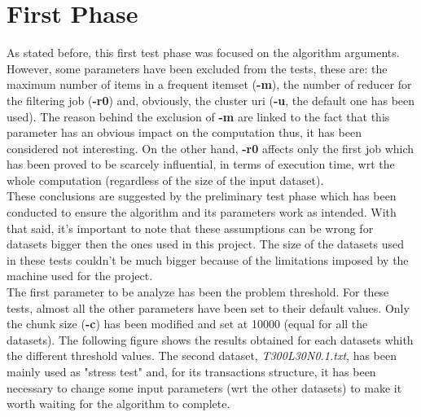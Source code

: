 \documentclass[]{report}
\begin{document}
   	\section*{First Phase}
   	
   	As stated before, this first test phase was focused on the algorithm arguments. However, some parameters have been excluded from the tests, these are: the maximum number of items in a frequent itemset (\textbf{-m}), the number of reducer for the filtering job (\textbf{-r0}) and, obviously, the cluster uri (\textbf{-u}, the default one has been used). The reason behind the exclusion of \textbf{-m} are linked to the fact that this parameter has an obvious impact on the computation thus, it has been considered not interesting. On the other hand, \textbf{-r0} affects only the first job which has been proved to be scarcely influential, in terms of execution time, wrt the whole computation (regardless of the size of the input dataset). \\
   	These conclusions are suggested by the preliminary test phase which has been conducted to ensure the algorithm and its parameters work as intended. With that said, it's important to note that these assumptions can be wrong for datasets bigger then the ones used in this project. The size of the datasets used in these tests couldn't be much bigger because of the limitations imposed by the machine used for the project.\\
   	The first parameter to be analyze has been the problem threshold. For these tests, almost all the other parameters have been set to their default values. Only the chunk size (\textbf{-c}) has been modified and set at 10000 (equal for all the datasets).      
   	The following figure shows the results obtained for each datasets whith the different threshold values. The second dataset, \textit{T300L30N0.1.txt}, has been mainly used as "stress test" and, for its transactions structure, it has been necessary to change some input parameters (wrt the other datasets) to make it worth waiting for the algorithm to complete. 
   	\begin{figure}[h]
   		\centering
   	\end{figure}
\end{document}
